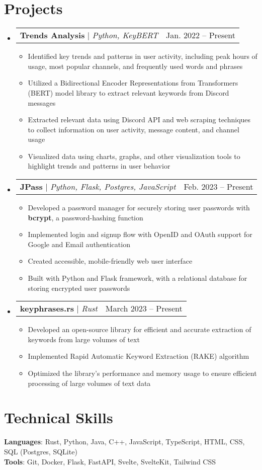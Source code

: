 \documentclass[letterpaper,11pt]{article}
\makeatletter
\newcommand{\resumeItem}[1]{
  \item\small{
    {#1 \vspace{-2pt}}
  }
}
\newcommand{\resumeProjectHeading}[2]{
    \item
    \begin{tabular*}{0.97\textwidth}{l@{\extracolsep{\fill}}r}
      \small#1 & #2 \\
    \end{tabular*}\vspace{-7pt}
}
\newcommand{\resumeSubHeadingListStart}{\begin{itemize}[leftmargin=0.15in, label={}]}
\newcommand{\resumeSubHeadingListEnd}{\end{itemize}}
\newcommand{\resumeItemListStart}{\begin{itemize}}
\newcommand{\resumeItemListEnd}{\end{itemize}\vspace{-5pt}}
\makeatother
\begin{document}
\section{Projects}
    \resumeSubHeadingListStart
        \resumeProjectHeading
              {\textbf{Trends Analysis} $|$ \emph{Python, KeyBERT}}{Jan. 2022 -- Present}
              \resumeItemListStart
                \resumeItem{Identified key trends and patterns in user activity, including peak hours of usage, most popular channels, and frequently used words and phrases}
                \resumeItem{Utilized a Bidirectional Encoder Representations from Transformers (BERT) model library to extract relevant keywords from Discord messages}
                \resumeItem{Extracted relevant data using Discord API and web scraping techniques to collect information on user activity, message content, and channel usage}
                \resumeItem{Visualized data using charts, graphs, and other visualization tools to highlight trends and patterns in user behavior}
              \resumeItemListEnd
      \resumeProjectHeading
          {\textbf{JPass} $|$ \emph{Python, Flask, Postgres, JavaScript}}{Feb. 2023 -- Present}
          \resumeItemListStart
            \resumeItem{Developed a password manager for securely storing user passwords with \textbf{bcrypt}, a password-hashing function}
            \resumeItem{Implemented login and signup flow with OpenID and OAuth support for Google and Email authentication}
            \resumeItem{Created accessible, mobile-friendly web user interface}
            \resumeItem{Built with Python and Flask framework, with a relational database for storing encrypted user passwords}
          \resumeItemListEnd
      \resumeProjectHeading
          {\textbf{keyphrases.rs} $|$ \emph{Rust}}{March 2023 -- Present}
          \resumeItemListStart
            \resumeItem{Developed an open-source library for efficient and accurate extraction of keywords from large volumes of text}
            \resumeItem{Implemented Rapid Automatic Keyword Extraction (RAKE) algorithm}
            \resumeItem{Optimized the library's performance and memory usage to ensure efficient processing of large volumes of text data}
          \resumeItemListEnd
    \resumeSubHeadingListEnd


\section{Technical Skills}
 \begin{itemize}[leftmargin=0.15in, label={}]
    \small{\item{
     \textbf{Languages}{: Rust, Python, Java, C++, JavaScript, TypeScript, HTML, CSS, SQL (Postgres, SQLite) } \\
     \textbf{Tools}{: Git, Docker, Flask, FastAPI, Svelte, SvelteKit, Tailwind CSS} \\
    }}
 \end{itemize}
\end{document}
